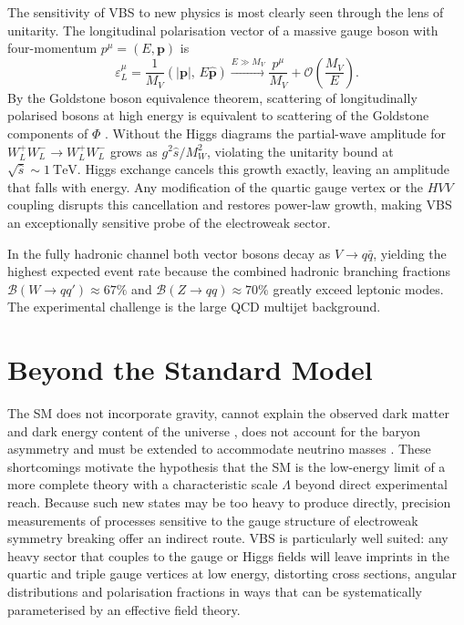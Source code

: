 The sensitivity of VBS to new physics is most clearly seen through the lens of unitarity. The longitudinal polarisation vector of a massive gauge boson with four-momentum $p^{\mu}=(E,\mathbf{p})$ is
\begin{equation}
\varepsilon_{L}^{\mu} = \frac{1}{M_{V}}\!\left(|\mathbf{p}|,\, E\hat{\mathbf{p}}\right) \xrightarrow{E\gg M_{V}} \frac{p^{\mu}}{M_{V}} + \mathcal{O}\!\left(\frac{M_{V}}{E}\right).
\end{equation}
By the Goldstone boson equivalence theorem, scattering of longitudinally polarised bosons at high energy is equivalent to scattering of the Goldstone components of $\Phi$ \cite{LlewellynSmith_Unitarity_1973, Cornwall_Unitarity_1974}. Without the Higgs diagrams the partial-wave amplitude for $W_{L}^{+}W_{L}^{-}\to W_{L}^{+}W_{L}^{-}$ grows as $g^{2}\hat{s}/M_{W}^{2}$, violating the unitarity bound at $\sqrt{\hat{s}}\sim 1\ \mathrm{TeV}$. Higgs exchange cancels this growth exactly, leaving an amplitude that falls with energy. Any modification of the quartic gauge vertex or the $HVV$ coupling disrupts this cancellation and restores power-law growth, making VBS an exceptionally sensitive probe of the electroweak sector.

In the fully hadronic channel both vector bosons decay as $V\to q\bar{q}$, yielding the highest expected event rate because the combined hadronic branching fractions $\mathcal{B}(W\to qq')\approx 67\%$ and $\mathcal{B}(Z\to qq)\approx 70\%$ greatly exceed leptonic modes. The experimental challenge is the large QCD multijet background.

\section{Beyond the Standard Model}

The SM does not incorporate gravity, cannot explain the observed dark matter and dark energy content of the universe \cite{Riess_DE_1998, RubinFordThonnard_DM_1980}, does not account for the baryon asymmetry \cite{Gavela_CP_1994} and must be extended to accommodate neutrino masses \cite{Fukuda_Nu_1998, Ahmad_SNO_2001}. These shortcomings motivate the hypothesis that the SM is the low-energy limit of a more complete theory with a characteristic scale $\Lambda$ beyond direct experimental reach. Because such new states may be too heavy to produce directly, precision measurements of processes sensitive to the gauge structure of electroweak symmetry breaking offer an indirect route. VBS is particularly well suited: any heavy sector that couples to the gauge or Higgs fields will leave imprints in the quartic and triple gauge vertices at low energy, distorting cross sections, angular distributions and polarisation fractions in ways that can be systematically parameterised by an effective field theory.

